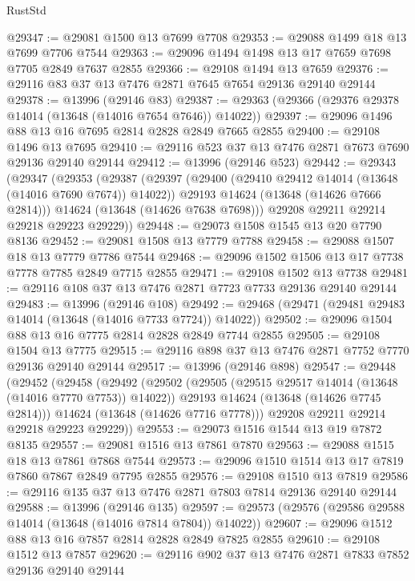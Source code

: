 \begin{lexlean}{RustStd}
\begin{coremodule}
@29347 := @29081 @1500 @13 @7699 @7708
@29353 := @29088 @1499 @18 @13 @7699 @7706 @7544
@29363 := @29096 @1494 @1498 @13 @17 @7659 @7698 @7705 @2849 @7637 @2855
@29366 := @29108 @1494 @13 @7659
@29376 := @29116 @83 @37 @13 @7476 @2871 @7645 @7654 @29136 @29140 @29144
@29378 := @13996 (@29146 @83)
@29387 := @29363 (@29366 (@29376 @29378 @14014 (@13648 (@14016 @7654 @7646)) @14022))
@29397 := @29096 @1496 @88 @13 @16 @7695 @2814 @2828 @2849 @7665 @2855
@29400 := @29108 @1496 @13 @7695
@29410 := @29116 @523 @37 @13 @7476 @2871 @7673 @7690 @29136 @29140 @29144
@29412 := @13996 (@29146 @523)
@29442 := @29343
    (@29347
      (@29353
        (@29387
          (@29397
            (@29400 (@29410 @29412 @14014 (@13648 (@14016 @7690 @7674)) @14022))
            @29193
            @14624
            (@13648 (@14626 @7666 @2814)))
          @14624
          (@13648 (@14626 @7638 @7698)))
        @29208
        @29211
        @29214
        @29218
        @29223
        @29229))
@29448 := @29073 @1508 @1545 @13 @20 @7790 @8136
@29452 := @29081 @1508 @13 @7779 @7788
@29458 := @29088 @1507 @18 @13 @7779 @7786 @7544
@29468 := @29096 @1502 @1506 @13 @17 @7738 @7778 @7785 @2849 @7715 @2855
@29471 := @29108 @1502 @13 @7738
@29481 := @29116 @108 @37 @13 @7476 @2871 @7723 @7733 @29136 @29140 @29144
@29483 := @13996 (@29146 @108)
@29492 := @29468 (@29471 (@29481 @29483 @14014 (@13648 (@14016 @7733 @7724)) @14022))
@29502 := @29096 @1504 @88 @13 @16 @7775 @2814 @2828 @2849 @7744 @2855
@29505 := @29108 @1504 @13 @7775
@29515 := @29116 @898 @37 @13 @7476 @2871 @7752 @7770 @29136 @29140 @29144
@29517 := @13996 (@29146 @898)
@29547 := @29448
    (@29452
      (@29458
        (@29492
          (@29502
            (@29505 (@29515 @29517 @14014 (@13648 (@14016 @7770 @7753)) @14022))
            @29193
            @14624
            (@13648 (@14626 @7745 @2814)))
          @14624
          (@13648 (@14626 @7716 @7778)))
        @29208
        @29211
        @29214
        @29218
        @29223
        @29229))
@29553 := @29073 @1516 @1544 @13 @19 @7872 @8135
@29557 := @29081 @1516 @13 @7861 @7870
@29563 := @29088 @1515 @18 @13 @7861 @7868 @7544
@29573 := @29096 @1510 @1514 @13 @17 @7819 @7860 @7867 @2849 @7795 @2855
@29576 := @29108 @1510 @13 @7819
@29586 := @29116 @135 @37 @13 @7476 @2871 @7803 @7814 @29136 @29140 @29144
@29588 := @13996 (@29146 @135)
@29597 := @29573 (@29576 (@29586 @29588 @14014 (@13648 (@14016 @7814 @7804)) @14022))
@29607 := @29096 @1512 @88 @13 @16 @7857 @2814 @2828 @2849 @7825 @2855
@29610 := @29108 @1512 @13 @7857
@29620 := @29116 @902 @37 @13 @7476 @2871 @7833 @7852 @29136 @29140 @29144

\end{coremodule}
\end{lexlean}
